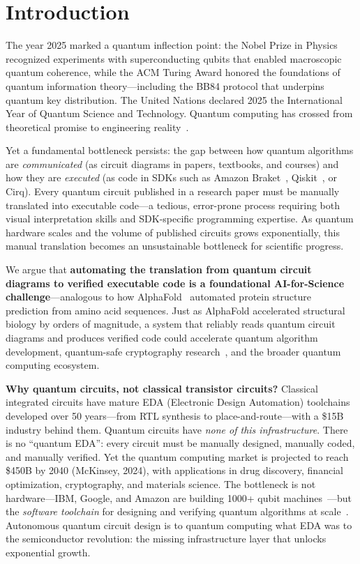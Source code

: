 \documentclass[conference]{IEEEtran}
\begin{document}
\section{Introduction}

The year 2025 marked a quantum inflection point: the Nobel Prize in Physics recognized experiments with superconducting qubits that enabled macroscopic quantum coherence, while the ACM Turing Award honored the foundations of quantum information theory---including the BB84 protocol that underpins quantum key distribution. The United Nations declared 2025 the International Year of Quantum Science and Technology. Quantum computing has crossed from theoretical promise to engineering reality~\cite{arute2019supremacy,kim2023utility,acharya2023suppressing}.

Yet a fundamental bottleneck persists: the gap between how quantum algorithms are \emph{communicated} (as circuit diagrams in papers, textbooks, and courses) and how they are \emph{executed} (as code in SDKs such as Amazon Braket~\cite{braket}, Qiskit~\cite{qiskit}, or Cirq). Every quantum circuit published in a research paper must be manually translated into executable code---a tedious, error-prone process requiring both visual interpretation skills and SDK-specific programming expertise. As quantum hardware scales and the volume of published circuits grows exponentially, this manual translation becomes an unsustainable bottleneck for scientific progress.

We argue that \textbf{automating the translation from quantum circuit diagrams to verified executable code is a foundational AI-for-Science challenge}---analogous to how AlphaFold~\cite{jumper2021alphafold} automated protein structure prediction from amino acid sequences. Just as AlphaFold accelerated structural biology by orders of magnitude, a system that reliably reads quantum circuit diagrams and produces verified code could accelerate quantum algorithm development, quantum-safe cryptography research~\cite{fedorov2018quantum,liu2026quantumsafe}, and the broader quantum computing ecosystem.

\textbf{Why quantum circuits, not classical transistor circuits?} Classical integrated circuits have mature EDA (Electronic Design Automation) toolchains developed over 50 years---from RTL synthesis to place-and-route---with a \$15B industry behind them. Quantum circuits have \emph{none of this infrastructure}. There is no ``quantum EDA'': every circuit must be manually designed, manually coded, and manually verified. Yet the quantum computing market is projected to reach \$450B by 2040 (McKinsey, 2024), with applications in drug discovery, financial optimization, cryptography, and materials science. The bottleneck is not hardware---IBM, Google, and Amazon are building 1000+ qubit machines~\cite{kim2023utility,acharya2023suppressing}---but the \emph{software toolchain} for designing and verifying quantum algorithms at scale~\cite{preskill2018quantum,cerezo2021variational}. Autonomous quantum circuit design is to quantum computing what EDA was to the semiconductor revolution: the missing infrastructure layer that unlocks exponential growth.
\end{document}
